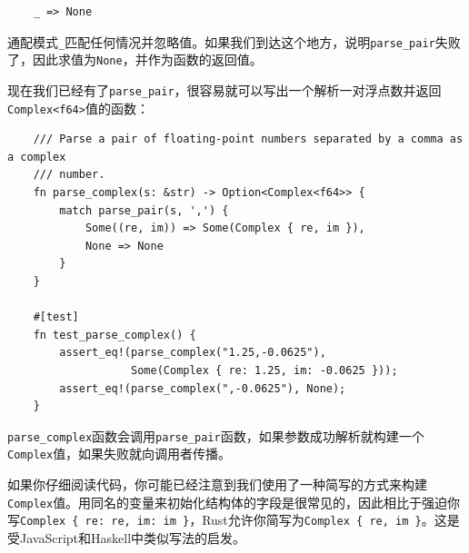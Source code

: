 \begin{verbatim}
    _ => None
\end{verbatim}

通配模式\texttt{\_}匹配任何情况并忽略值。如果我们到达这个地方，说明\texttt{parse\_pair}失败了，因此求值为\texttt{None}，并作为函数的返回值。

现在我们已经有了\texttt{parse\_pair}，很容易就可以写出一个解析一对浮点数并返回\\
\texttt{Complex<f64>}值的函数：
\begin{verbatim}
    /// Parse a pair of floating-point numbers separated by a comma as a complex
    /// number.
    fn parse_complex(s: &str) -> Option<Complex<f64>> {
        match parse_pair(s, ',') {
            Some((re, im)) => Some(Complex { re, im }),
            None => None
        }
    }

    #[test]
    fn test_parse_complex() {
        assert_eq!(parse_complex("1.25,-0.0625"),
                   Some(Complex { re: 1.25, im: -0.0625 }));
        assert_eq!(parse_complex(",-0.0625"), None);
    }
\end{verbatim}

\texttt{parse\_complex}函数会调用\texttt{parse\_pair}函数，如果参数成功解析就构建一个\texttt{Complex}值，如果失败就向调用者传播。

如果你仔细阅读代码，你可能已经注意到我们使用了一种简写的方式来构建\texttt{Complex}值。用同名的变量来初始化结构体的字段是很常见的，因此相比于强迫你写\texttt{Complex \{ re: re, im: im \}}，Rust允许你简写为\texttt{Complex \{ re, im \}}。这是受JavaScript和Haskell中类似写法的启发。


